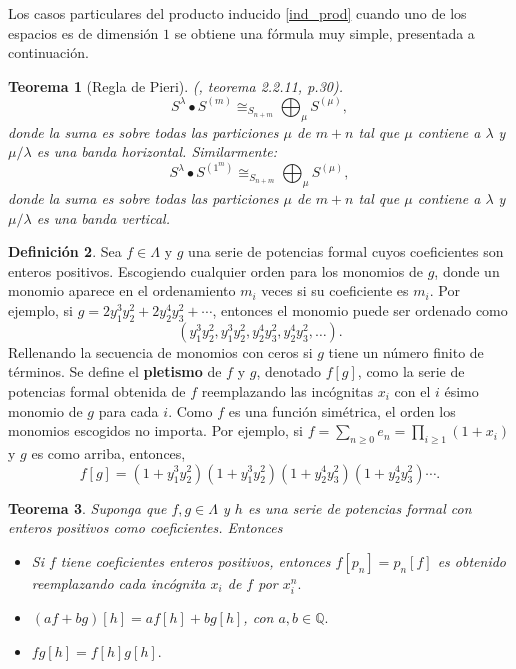 \documentclass[12pt]{book}
\newtheorem{theorem}{Teorema}[section]
\theoremstyle{definition}
\newtheorem{definition}[theorem]{Definición}
\newcounter{in}
\newcounter{ini}
\begin{document}
Los casos particulares del producto inducido \ref{ind_prod} cuando uno de los espacios es
de dimensión $1$ se obtiene una fórmula muy simple, presentada a
continuación.
\begin{theorem}[Regla de Pieri]{\normalfont(\cite{wachs2006poset}, teorema 2.2.11, p.30)}.
\label{pieri_rule}
$$S^{\lambda} \bullet S^{(m)} \cong_{S_{n + m}} \bigoplus_{\mu} S^{(\mu)},$$
donde la suma es sobre todas las particiones $\mu$ de $m + n$ tal que
$\mu$ contiene a $\lambda$ y $\mu / \lambda$ es una banda
horizontal. Similarmente:
$$S^{\lambda} \bullet S^{(1^{m})} \cong_{S_{n + m}} \bigoplus_{\mu} S^{(\mu)},$$
donde la suma es sobre todas las particiones $\mu$ de $m + n$ tal que
$\mu$ contiene a $\lambda$ y $\mu / \lambda$ es una banda vertical.
\end{theorem}
\begin{definition}
  \label{s_f_u}
  Sea $f \in \Lambda$ y $g$ una serie de potencias formal cuyos
  coeficientes son enteros positivos. Escogiendo cualquier orden para
  los monomios de $g$, donde un monomio aparece en el ordenamiento
  $m_{i}$ veces si su coeficiente es $m_{i}$. Por ejemplo, si
  $g=2y_{1}^{3}y_{2}^{2}+2y_{2}^{4}y_{3}^{2}+\cdots$, entonces el
  monomio puede ser ordenado como
  $$(y_{1}^{3}y_{2}^{2},y_{1}^{3}y_{2}^{2},y_{2}^{4}y_{3}^{2},y_{2}^{4}y_{3}^{2},\ldots).$$
Rellenando la secuencia de monomios con ceros si $g$ tiene un número
finito de términos. Se define el \textbf{pletismo} de $f$ y $g$,
denotado $f \left [ g \right ]$, como la serie de potencias formal
obtenida de $f$ reemplazando las incógnitas $x_{i}$ con el $i$ ésimo
monomio de $g$ para cada $i$. Como $f$ es una función simétrica, el
orden los monomios escogidos no importa. Por ejemplo, si
$f = \sum_{n \geq 0}e_n = \prod_{i \geq 1}(1 + x_{i})$ y $g$ es como
arriba, entonces,
\begin{equation}
  \label{eq:105}
  f \left [ g \right ] = (1 +y_{1}^{3}y_{2}^{2}) (1 +y_{1}^{3}y_{2}^{2}) (1 +y_{2}^{4}y_{3}^{2}) (1 +y_{2}^{4}y_{3}^{2}) \cdots .
\end{equation}
\end{definition}
\begin{theorem}
  \label{ple_pr}
  Suponga que $f, g \in \Lambda$ y $h$ es una serie de potencias
  formal con enteros positivos como coeficientes. Entonces
\begin{itemize}
\item Si $f$ tiene coeficientes enteros positivos, entonces
  $f \left [ p_{n} \right ] = p_{n} \left [ f \right ]$ es obtenido
  reemplazando cada incógnita $x_{i}$ de $f$ por $x_{i}^{n}.$
\item $(af + bg) \left [ h \right ] = af \left [ h \right ] + bg \left [ h \right ]$, con $a,b \in \mathbb{Q}.$
\item $fg \left [ h \right ] = f \left [ h \right ] g \left [ h \right ].$
\end{itemize} 
\end{theorem}
\end{document}
